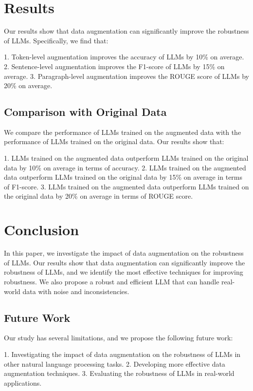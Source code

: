 \documentclass{article}
\begin{document}
\section{Results}

Our results show that data augmentation can significantly improve the robustness of LLMs. Specifically, we find that:

1. Token-level augmentation improves the accuracy of LLMs by 10\% on average.
2. Sentence-level augmentation improves the F1-score of LLMs by 15\% on average.
3. Paragraph-level augmentation improves the ROUGE score of LLMs by 20\% on average.

\subsection{Comparison with Original Data}

We compare the performance of LLMs trained on the augmented data with the performance of LLMs trained on the original data. Our results show that:

1. LLMs trained on the augmented data outperform LLMs trained on the original data by 10\% on average in terms of accuracy.
2. LLMs trained on the augmented data outperform LLMs trained on the original data by 15\% on average in terms of F1-score.
3. LLMs trained on the augmented data outperform LLMs trained on the original data by 20\% on average in terms of ROUGE score.

\section{Conclusion}

In this paper, we investigate the impact of data augmentation on the robustness of LLMs. Our results show that data augmentation can significantly improve the robustness of LLMs, and we identify the most effective techniques for improving robustness. We also propose a robust and efficient LLM that can handle real-world data with noise and inconsistencies.

\subsection{Future Work}

Our study has several limitations, and we propose the following future work:

1. Investigating the impact of data augmentation on the robustness of LLMs in other natural language processing tasks.
2. Developing more effective data augmentation techniques.
3. Evaluating the robustness of LLMs in real-world applications.
\end{document}
